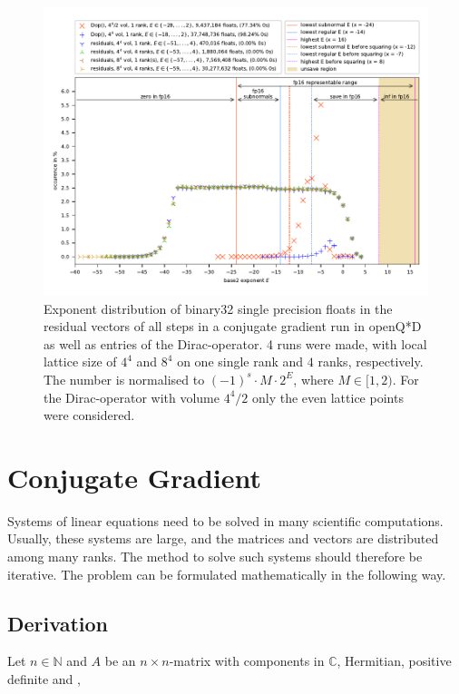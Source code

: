 \documentclass{article}
\theoremstyle{plain} %
\theoremstyle{convention} %
\theoremstyle{remark} %
\numberwithin{equation}{section}
\begin{document}
\begin{figure}[htbp]
    \centering
    \includegraphics[width=1.0\textwidth]{plots/exponents_dirac}
    \caption{Exponent distribution of \gls{binary32} single precision floats in the residual vectors of all steps in a conjugate gradient run in openQ*D as well as entries of the Dirac-operator. 4 runs were made, with local lattice size of $4^4$ and $8^4$ on one single rank and $4$ ranks, respectively. The number is normalised to $(-1)^s \cdot M \cdot 2^{E}$, where $M \in [1, 2)$. For the Dirac-operator with volume $4^4/2$ only the even lattice points were considered.}
    \label{fig:exponents}
\end{figure}

\newpage

\section{Conjugate Gradient}

\label{sec:cg}

Systems of linear equations need to be solved in many scientific computations. Usually, these systems are large, and the matrices and vectors are distributed among many \glspl{rank}. The method to solve such systems should therefore be iterative. The problem can be formulated mathematically in the following way.

\subsection{Derivation}

Let $n \in \mathbb{N}$ and $A$ be an $n \times n$-matrix with components in $\mathbb{C}$, Hermitian, positive definite and ,
\end{document}
